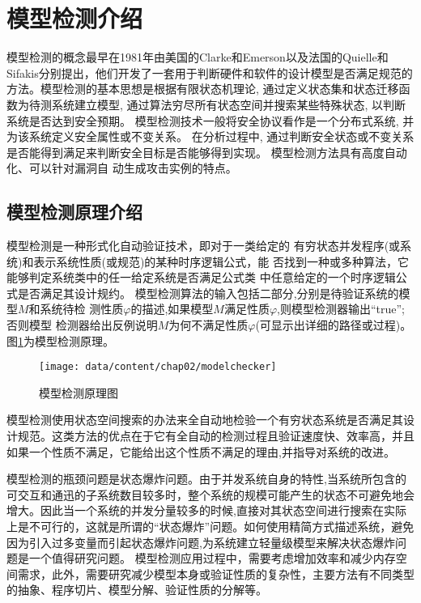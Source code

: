 \section{模型检测介绍}
模型检测的概念最早在1981年由美国的Clarke和Emerson以及法国的Quielle和Sifakis分别提出，他们开发了一套用于判断硬件和软件的设计模型是否满足规范的方法。模型检测的基本思想是根据有限状态机理论, 通过定义状态集和状态迁移函数为待测系统建立模型, 通过算法穷尽所有状态空间并搜索某些特殊状态, 以判断系统是否达到安全预期。 模型检测技术一般将安全协议看作是一个分布式系统, 并为该系统定义安全属性或不变关系。 在分析过程中, 通过判断安全状态或不变关系是否能得到满足来判断安全目标是否能够得到实现。 模型检测方法具有高度自动化、可以针对漏洞自
动生成攻击实例的特点。

\subsection{模型检测原理介绍}
模型检测是一种形式化自动验证技术，即对于一类给定的
有穷状态并发程序(或系统)和表示系统性质(或规范)的某种时序逻辑公式，能
否找到一种或多种算法，它能够判定系统类中的任一给定系统是否满足公式类
中任意给定的一个时序逻辑公式是否满足其设计规约。
模型检测算法的输入包括二部分,分别是待验证系统的模型$M$和系统待检
测性质$\varphi$的描述,如果模型$M$满足性质$\varphi$,则模型检测器输出“true”;否则模型
检测器给出反例说明$M$为何不满足性质$\varphi$(可显示出详细的路径或过程)。图\ref{fig-modelchecker3}为模型检测原理。

\begin{figure}[htp]
	\centering
	\texttt{[image: data/content/chap02/modelchecker]}
	\caption{模型检测原理图}
	\label{fig-modelchecker3}
\end{figure}


模型检测使用状态空间搜索的办法来全自动地检验一个有穷状态系统是否满足其设计规范。这类方法的优点在于它有全自动的检测过程且验证速度快、效率高，并且如果一个性质不满足，它能给出这个性质不满足的理由,并指导对系统的改进。

模型检测的瓶颈问题是状态爆炸问题。由于并发系统自身的特性,当系统所包含的可交互和通迅的子系统数目较多时，整个系统的规模可能产生的状态不可避免地会增大。因此当一个系统的并发分量较多的时候,直接对其状态空间进行搜索在实际上是不可行的，这就是所谓的“状态爆炸”问题。如何使用精简方式描述系统，避免因为引入过多变量而引起状态爆炸问题,为系统建立轻量级模型来解决状态爆炸问题是一个值得研究问题。
模型检测应用过程中，需要考虑增加效率和减少内存空间需求，此外，需要研究减少模型本身或验证性质的复杂性，主要方法有不同类型的抽象、程序切片、模型分解、验证性质的分解等。

